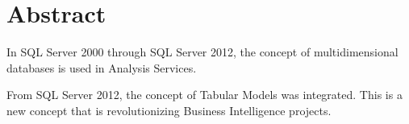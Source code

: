 \section{Abstract}


In SQL Server 2000 through SQL Server 2012, the concept of multidimensional databases is used in Analysis Services.

From SQL Server 2012, the concept of Tabular Models was integrated. This is a new concept that is revolutionizing Business Intelligence projects.